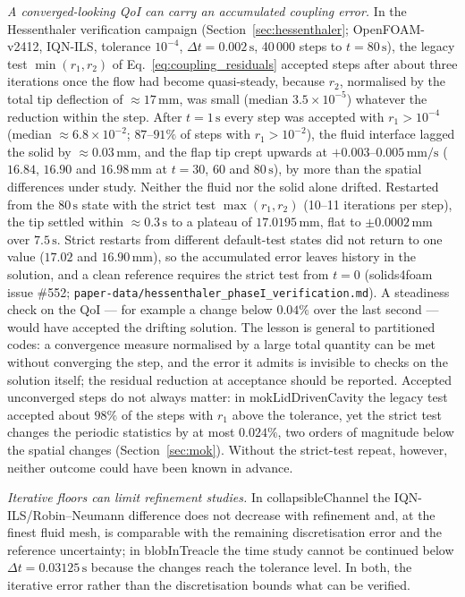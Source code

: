 \emph{A converged-looking QoI can carry an accumulated coupling error.}
In the Hessenthaler verification campaign (Section~\ref{sec:hessenthaler}; OpenFOAM-v2412, IQN-ILS, tolerance $10^{-4}$, $\Delta t = 0.002\,\mathrm{s}$, 40\,000 steps to $t = 80\,\mathrm{s}$), the legacy test $\min(r_1, r_2)$ of Eq.~\eqref{eq:coupling_residuals} accepted steps after about three iterations once the flow had become quasi-steady, because $r_2$, normalised by the total tip deflection of $\approx17\,\mathrm{mm}$, was small (median $3.5\times10^{-5}$) whatever the reduction within the step.
After $t = 1\,\mathrm{s}$ every step was accepted with $r_1 > 10^{-4}$ (median $\approx6.8\times10^{-2}$; $87$--$91\%$ of steps with $r_1 > 10^{-2}$), the fluid interface lagged the solid by $\approx0.03\,\mathrm{mm}$, and the flap tip crept upwards at $+0.003$--$0.005\,\mathrm{mm/s}$ ($16.84$, $16.90$ and $16.98\,\mathrm{mm}$ at $t = 30$, $60$ and $80\,\mathrm{s}$), by more than the spatial differences under study.
Neither the fluid nor the solid alone drifted.
Restarted from the $80\,\mathrm{s}$ state with the strict test $\max(r_1, r_2)$ (10--11 iterations per step), the tip settled within $\approx0.3\,\mathrm{s}$ to a plateau of $17.0195\,\mathrm{mm}$, flat to $\pm0.0002\,\mathrm{mm}$ over $7.5\,\mathrm{s}$.
Strict restarts from different default-test states did not return to one value ($17.02$ and $16.90\,\mathrm{mm}$), so the accumulated error leaves history in the solution, and a clean reference requires the strict test from $t = 0$ (solids4foam issue \#552; \texttt{paper-data/hessenthaler\_phaseI\_verification.md}).
A steadiness check on the QoI --- for example a change below $0.04\%$ over the last second --- would have accepted the drifting solution.
The lesson is general to partitioned codes: a convergence measure normalised by a large total quantity can be met without converging the step, and the error it admits is invisible to checks on the solution itself; the residual reduction at acceptance should be reported.
Accepted unconverged steps do not always matter: in mokLidDrivenCavity the legacy test accepted about $98\%$ of the steps with $r_1$ above the tolerance, yet the strict test changes the periodic statistics by at most $0.024\%$, two orders of magnitude below the spatial changes (Section~\ref{sec:mok}). Without the strict-test repeat, however, neither outcome could have been known in advance.


\emph{Iterative floors can limit refinement studies.}
In collapsibleChannel the IQN-ILS/Robin--Neumann difference does not decrease with refinement and, at the finest fluid mesh, is comparable with the remaining discretisation error and the reference uncertainty; in blobInTreacle the time study cannot be continued below $\Delta t = 0.03125\,\mathrm{s}$ because the changes reach the tolerance level.
In both, the iterative error rather than the discretisation bounds what can be verified.

